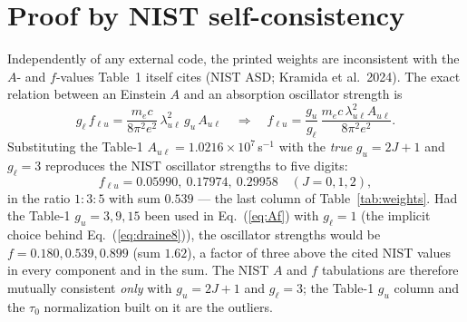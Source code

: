 \documentclass[english,a4paper]{my_memo}
\newcommand{\gu}{g_u}
\newcommand{\gl}{g_\ell}
\begin{document}
\section{Proof by NIST self-consistency}
Independently of any external code, the printed weights are inconsistent
with the $A$- and $f$-values Table~1 itself cites (NIST ASD; Kramida et
al.\ 2024).  The exact relation between an Einstein $A$ and an absorption
oscillator strength is
\begin{equation}
  \gl\, f_{\ell u}
    = \frac{m_e c}{8\pi^2 e^2}\,\lambda_{u\ell}^2\, \gu\, A_{u\ell}
  \quad\Longrightarrow\quad
  f_{\ell u} = \frac{\gu}{\gl}\,
    \frac{m_e c\,\lambda_{u\ell}^2 A_{u\ell}}{8\pi^2 e^2}.
  \label{eq:Af}
\end{equation}
Substituting the Table-1 $A_{u\ell} = 1.0216\times10^7$\,s$^{-1}$ with the
\emph{true} $\gu = 2J+1$ and $\gl = 3$ reproduces the NIST oscillator
strengths to five digits:
\[
  f_{\ell u} = 0.05990,\ 0.17974,\ 0.29958
  \quad (J = 0, 1, 2),
\]
in the ratio $1:3:5$ with sum $0.539$ --- the last column of
Table~\ref{tab:weights}.  Had the Table-1 $\gu = 3, 9, 15$ been used in
Eq.~(\ref{eq:Af}) with $\gl = 1$ (the implicit choice behind
Eq.~(\ref{eq:draine8})), the oscillator strengths would be
$f = 0.180, 0.539, 0.899$ (sum $1.62$), a factor of three above the cited
NIST values in every component and in the sum.  The NIST $A$ and $f$ tabulations are therefore mutually
consistent \emph{only} with $\gu = 2J+1$ and $\gl = 3$; the Table-1 $g_u$
column and the $\tau_0$ normalization built on it are the outliers.

\end{document}
